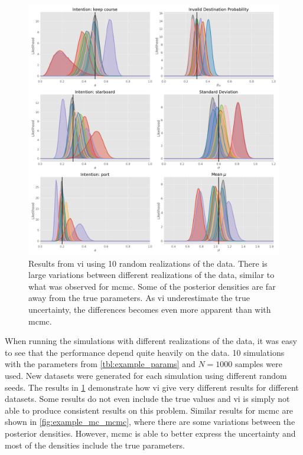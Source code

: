 \begin{figure}[h]
    \centering
    \includegraphics[width=\textwidth]{figures/mc_sim_vi.png}
    \caption{Results from \acrshort{vi} using 10 random realizations of the data. There is large variations between different realizations of the data, similar to what was observed for \acrshort{mcmc}. Some of the posterior densities are far away from the true parameters. As \acrshort{vi} underestimate the true uncertainty, the differences becomes even more apparent than with \acrshort{mcmc}. }
    \label{fig:example_mc_vi}
\end{figure}

When running the simulations with different realizations of the data, it was easy to see that the performance depend quite heavily on the data. 10 simulations with the parameters from \cref{tbl:example_params} and $N=1000$ samples were used. New datasets were generated for each simulation using different random seeds. The results in \cref{fig:example_mc_vi} demonstrate how \acrshort{vi} give very different results for different datasets. Some results do not even include the true values and \acrshort{vi} is simply not able to produce consistent results on this problem. 
Similar results for \acrshort{mcmc} are shown in \cref{fig:example_mc_mcmc}, where there are some variations between the posterior densities. However, \acrshort{mcmc} is able to better express the uncertainty and most of the densities include the true parameters.


